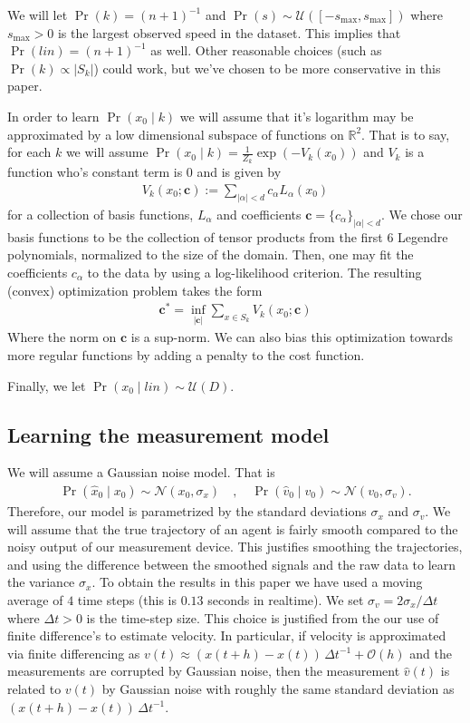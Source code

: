 \documentclass[conference]{IEEEtran}
\begin{document}
  We will let $\Pr(k) = (n+1)^{-1}$ and $\Pr(s) \sim \mathcal{U}( [-s_{\max}, s_{\max} ] )$
  where $s_{\max}>0$ is the largest observed speed in the dataset.  This implies that $\Pr(lin) = (n+1)^{-1}$ as well.
  Other reasonable choices (such as $\Pr(k) \propto | S_k|$) could work, but we've chosen to be more conservative in this paper.
  
  In order to learn $\Pr( x_0 \mid k)$ we will assume that it's logarithm may be approximated by a low dimensional subspace of functions on $\mathbb{R}^2$.
  That is to say, for each $k$ we will assume $\Pr( x_0 \mid k) = \frac{1}{Z_k} \exp( - V_k(x_0) )$ and $V_k$ is a function who's constant term is $0$ and is given by
  \begin{align*}
  	V_k(x_0; \mathbf{c} ) := \sum_{|\alpha|< d} c_{\alpha} L_{\alpha}( x_0)
  \end{align*}
  for a collection of basis functions, $L_{\alpha}$ and coefficients $\mathbf{c} = \{ c_{\alpha} \}_{|\alpha| < d}$.
  We chose our basis functions to be the collection of tensor products from the first $6$ Legendre polynomials, normalized to the size of the domain.
  Then, one may fit the coefficients $c_{\alpha}$ to the data by using a log-likelihood criterion.
  The resulting (convex) optimization problem takes the form
  \begin{align*}
  	\mathbf{c}^* = \inf_{ |\mathbf{c}| } \sum_{x \in S_k} V_k( x_0; \mathbf{c})
  \end{align*}
  Where the norm on $\mathbf{c}$ is a sup-norm.
  We can also bias this optimization towards more regular functions by adding a penalty to the cost function.
  
  Finally, we let $\Pr( x_0 \mid lin) \sim \mathcal{U}(D)$.
  
  \subsection{Learning the measurement model}
  We will assume a Gaussian noise model.  That is
  \begin{align*}
  	\Pr( \hat{x}_0 \mid x_0 ) \sim \mathcal{N}( x_0 , \sigma_x) \quad, \quad \Pr( \hat{v}_0 \mid v_0 ) \sim \mathcal{N}( v_0, \sigma_v).
  \end{align*}
  Therefore, our model is parametrized by the standard deviations $\sigma_x$ and $\sigma_v$.
  We will assume that the true trajectory of an agent is fairly smooth compared to the noisy output of our measurement device.
  This justifies smoothing the trajectories, and using the difference between the smoothed signals and the raw data to learn the variance $\sigma_x$.
  To obtain the results in this paper we have used a moving average of $4$ time steps (this is $0.13$ seconds in realtime).
  We set $\sigma_v = 2 \sigma_x / \Delta t$ where $\Delta t > 0$ is the time-step size.  This choice is justified from the our use of finite difference's to estimate velocity.
  In particular, if velocity is approximated via finite differencing as $v(t) \approx (x(t+h) - x(t))\,\Delta t^{-1} + \mathcal{O}(h)$
  and the measurements are corrupted by Gaussian noise, then the measurement $\hat{v}(t)$ is related to $v(t)$ by Gaussian noise with roughly the same standard deviation as $(x(t+h) - x(t))\,\Delta t^{-1}$.
  
\end{document}
